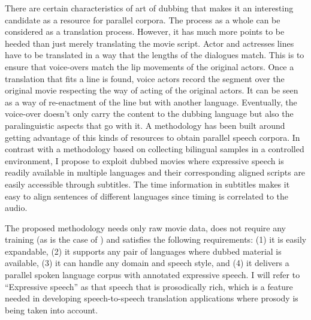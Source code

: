 There are certain characteristics of art of dubbing that makes it an interesting candidate as a resource for parallel corpora. The process as a whole can be considered as a translation process. However, it has much more points to be heeded than just merely translating the movie script. Actor and actresses lines have to be translated in a way that the lengths of the dialogues match. This is to ensure that voice-overs match the lip movements of the original actors. Once a translation that fits a line is found, voice actors record the segment over the original movie respecting the way of acting of the original actors. It can be seen as a way of re-enactment of the line but with another language. Eventually, the voice-over doesn't only carry the content to the dubbing language but also the paralinguistic aspects that go with it. 
A methodology has been built around getting advantage of this kinds of resources to obtain parallel speech corpora. In contrast with a methodology based on collecting bilingual samples in a controlled environment, I propose to exploit dubbed movies where expressive speech is readily available in multiple languages and their corresponding aligned scripts are easily accessible through subtitles. The time information in subtitles makes it easy to align sentences of different languages since timing is correlated to the audio. 

The proposed methodology needs only raw movie data, does not require any training (as is the case of \cite{tsiartas2011bilingual}) and satisfies the following requirements: (1) it is easily expandable, (2) it supports any pair of languages where dubbed material is available, (3) it can handle any domain and speech style, and (4) it delivers a parallel spoken language corpus with annotated expressive speech. I will refer to ``Expressive speech'' as that speech that is prosodically rich, which is a feature needed in developing speech-to-speech translation applications where prosody is being taken into account. %

